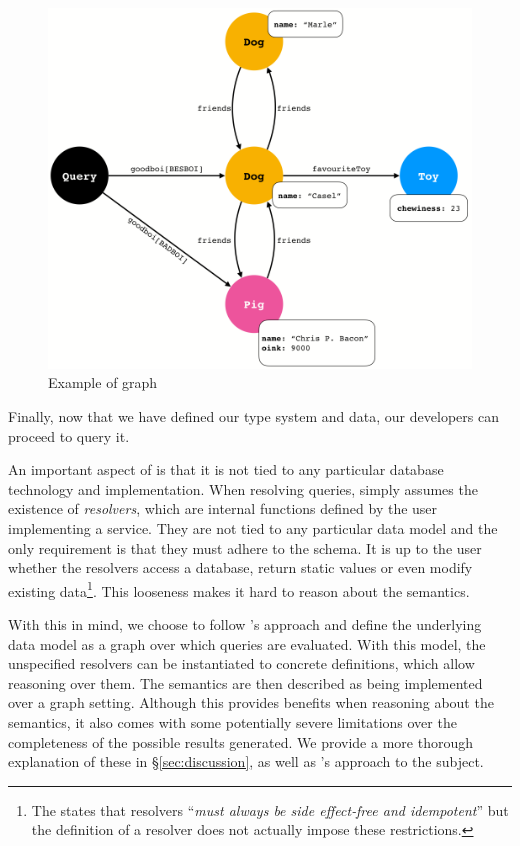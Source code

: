 \begin{figure}
    \centering
    \includegraphics[scale=0.23]{imgs/graph.png}
    \caption{Example of \gql graph }
    \label{fig:graph_ex}
\end{figure}

Finally, now that we have defined our type system and data, our developers can proceed to query it.

 An important aspect of \gql is that it is not tied to any particular database technology and implementation. When resolving queries, \gql simply assumes the existence of \textit{resolvers}, which are internal functions defined by the user implementing a \gql service. They are not tied to any particular data model and the only requirement is that they must adhere to the schema. It is up to the user whether the resolvers access a database, return static values or even modify existing data\footnote{The \spec{} states that resolvers ``\textit{must always be side effect‐free and idempotent}'' but the definition of a resolver does not actually impose these restrictions.}. This looseness makes it hard to reason about the semantics.

With this in mind, we choose to follow \HP's approach and define the underlying data model as a graph over which queries are evaluated. With this model, the unspecified resolvers can be instantiated to concrete definitions, which allow reasoning over them. The semantics are then described as being implemented over a graph setting. Although this provides benefits when reasoning about the semantics, it also comes with some potentially severe limitations over the completeness of the possible results generated. We provide a more thorough explanation of these in \S\ref{sec:discussion}, as well as \HP's approach to the subject.

